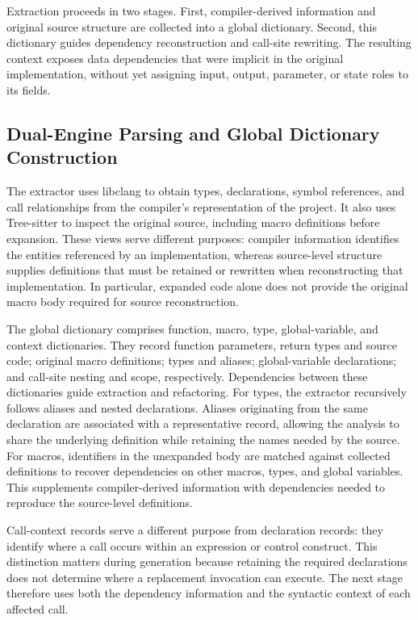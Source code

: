 \documentclass[manuscript, screen, review]{acmart}
\begin{document}
Extraction proceeds in two stages. First, compiler-derived information and original source structure are collected into a global dictionary. Second, this dictionary guides dependency reconstruction and call-site rewriting. The resulting context exposes data dependencies that were implicit in the original implementation, without yet assigning input, output, parameter, or state roles to its fields.

\subsection{Dual-Engine Parsing and Global Dictionary Construction}

The extractor uses libclang to obtain types, declarations, symbol references, and call relationships from the compiler's representation of the project. It also uses Tree-sitter to inspect the original source, including macro definitions before expansion. These views serve different purposes: compiler information identifies the entities referenced by an implementation, whereas source-level structure supplies definitions that must be retained or rewritten when reconstructing that implementation. In particular, expanded code alone does not provide the original macro body required for source reconstruction.

The global dictionary comprises function, macro, type, global-variable, and context dictionaries. They record function parameters, return types and source code; original macro definitions; types and aliases; global-variable declarations; and call-site nesting and scope, respectively. Dependencies between these dictionaries guide extraction and refactoring. For types, the extractor recursively follows aliases and nested declarations. Aliases originating from the same declaration are associated with a representative record, allowing the analysis to share the underlying definition while retaining the names needed by the source. For macros, identifiers in the unexpanded body are matched against collected definitions to recover dependencies on other macros, types, and global variables. This supplements compiler-derived information with dependencies needed to reproduce the source-level definitions.

Call-context records serve a different purpose from declaration records: they identify where a call occurs within an expression or control construct. This distinction matters during generation because retaining the required declarations does not determine where a replacement invocation can execute. The next stage therefore uses both the dependency information and the syntactic context of each affected call.
\end{document}
